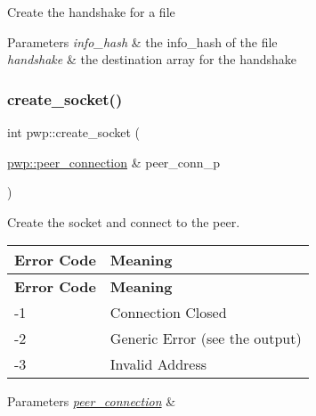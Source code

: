 Create the handshake for a file


\begin{DoxyParams}{Parameters}
{\em info\+\_\+hash} & the info\+\_\+hash of the file \\
\hline
{\em handshake} & the destination array for the handshake \\
\hline
\end{DoxyParams}
\mbox{\label{namespacepwp_a73acf05b954e39825a88036d5793db6b}} 
\subsubsection{\texorpdfstring{create\+\_\+socket()}{create\_socket()}}
{\footnotesize\ttfamily int pwp\+::create\+\_\+socket (\begin{DoxyParamCaption}\item[{\hyperlink{structpwp_1_1peer__connection}{pwp\+::peer\+\_\+connection} \&}]{peer\+\_\+conn\+\_\+p }\end{DoxyParamCaption})}



Create the socket and connect to the peer. 

\tabulinesep=1mm
\begin{longtabu} spread 0pt [c]{*{2}{|X[-1]}|}
\hline
\rowcolor{\tableheadbgcolor}\textbf{ Error Code }&\textbf{ Meaning  }\\
\endfirsthead
\hline
\endfoot
\hline
\rowcolor{\tableheadbgcolor}\textbf{ Error Code }&\textbf{ Meaning  }\\
\endhead
-\/1 &Connection Closed \\
-\/2 &Generic Error (see the output) \\
-\/3 &Invalid Address \\
\end{longtabu}



\begin{DoxyParams}{Parameters}
{\em \hyperlink{structpwp_1_1peer__connection}{peer\+\_\+connection}} & \\
\hline
\end{DoxyParams}
\mbox{\label{namespacepwp_ada6a8613896dbbfd6fba63b17d51684c}} 
